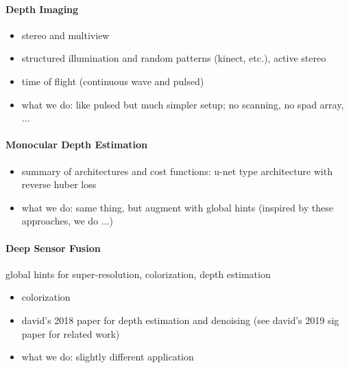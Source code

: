 \paragraph{Depth Imaging}

\begin{itemize}
	\item stereo and multiview
	\item structured illumination and random patterns (kinect, etc.), active stereo
	\item time of flight (continuous wave and pulsed)
	\item what we do: like pulsed but much simpler setup; no scanning, no spad array, ...
\end{itemize}


\paragraph{Monocular Depth Estimation}

\begin{itemize}
	\item summary of architectures and cost functions: u-net type architecture with reverse huber loss
	\item what we do: same thing, but augment with global hints (inspired by these approaches, we do ...)
\end{itemize}

\paragraph{Deep Sensor Fusion}

global hints for super-resolution, colorization, depth estimation 
%
\begin{itemize}
	\item colorization
	\item david's 2018 paper for depth estimation and denoising (see david's 2019 sig paper for related work)
	\item what we do: slightly different application
\end{itemize}

